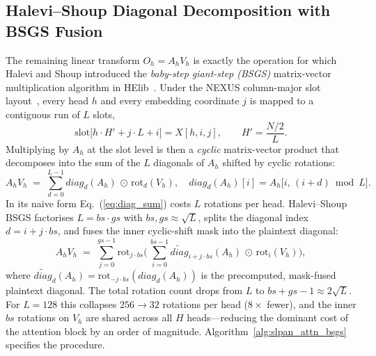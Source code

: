 \subsection{Halevi--Shoup Diagonal Decomposition with BSGS Fusion}
\label{sec:bsgs}

The remaining linear transform $O_h = A_h V_h$ is exactly the operation for which Halevi and Shoup introduced the \emph{baby-step giant-step (BSGS)} matrix-vector multiplication algorithm in HElib~\cite{halevi2014bsgs}. Under the NEXUS column-major slot layout~\cite{zhang2024nexus}, every head $h$ and every embedding coordinate $j$ is mapped to a contiguous run of $L$ slots,
\begin{equation}
\mathrm{slot}\bigl[h \cdot H' + j \cdot L + i\bigr] = X[h, i, j], \qquad H' = \frac{N/2}{L}.
\label{eq:colmajor}
\end{equation}
Multiplying by $A_h$ at the slot level is then a \emph{cyclic} matrix-vector product that decomposes into the sum of the $L$ diagonals of $A_h$ shifted by cyclic rotations:
\begin{equation}
A_h V_h \;=\; \sum_{d=0}^{L-1} \mathit{diag}_d(A_h) \,\odot\, \mathrm{rot}_d(V_h), \quad \mathit{diag}_d(A_h)[i] = A_h\bigl[i,\, (i+d)\bmod L\bigr].
\label{eq:diag_sum}
\end{equation}
In its naive form Eq.~(\ref{eq:diag_sum}) costs $L$ rotations per head. Halevi--Shoup BSGS factorises $L = bs \cdot gs$ with $bs, gs \approx \sqrt{L}$, splits the diagonal index $d = i + j \cdot bs$, and fuses the inner cyclic-shift mask into the plaintext diagonal:
\begin{equation}
A_h V_h \;=\; \sum_{j=0}^{gs-1} \mathrm{rot}_{j \cdot bs}\!\Biggl(\,\sum_{i=0}^{bs-1} \widetilde{\mathit{diag}}_{i + j\cdot bs}(A_h) \,\odot\, \mathrm{rot}_i(V_h)\Biggr),
\label{eq:bsgs}
\end{equation}
where $\widetilde{\mathit{diag}}_{d}(A_h) = \mathrm{rot}_{-j\cdot bs}(\mathit{diag}_{d}(A_h))$ is the precomputed, mask-fused plaintext diagonal. The total rotation count drops from $L$ to $bs + gs - 1 \approx 2\sqrt{L}$. For $L = 128$ this collapses $256 \to 32$ rotations per head ($8\times$ fewer), and the inner $bs$ rotations on $V_h$ are shared across all $H$ heads---reducing the dominant cost of the attention block by an order of magnitude. Algorithm~\ref{alg:slpan_attn_bsgs} specifies the procedure.

